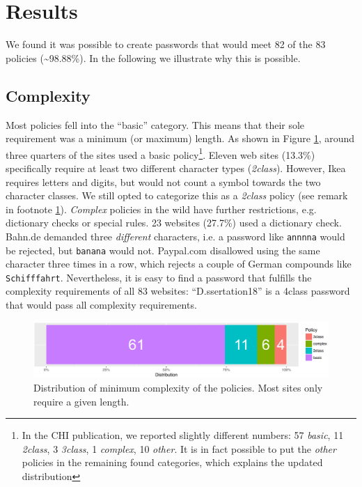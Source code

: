 
\section{Results}
We found it was possible to create passwords that would meet 82 of the 83 policies (\textasciitilde98.88\%). In the following we illustrate why this is possible. 

\subsection{Complexity}
Most policies fell into the ``basic'' category. This means that their sole requirement was a minimum (or maximum) length. As shown in Figure \ref{fig:policies_reuse:policies-distribution-edited}, around three quarters of the sites used a basic policy\footnote{\label{foot:policies_reuse:chi-publication-inconsistency}In the CHI publication, we reported slightly different numbers: 57 \textit{basic}, 11 \textit{2class}, 3 \textit{3class}, 1 \textit{complex}, 10 \textit{other}. It is in fact possible to put the \textit{other} policies in the remaining found categories, which explains the updated distribution}. 
Eleven web sites (13.3\%) specifically require at least two different character types (\textit{2class}). However, Ikea requires letters and digits, but would not count a symbol towards the two character classes. We still opted to categorize this as a \textit{2class} policy (see remark in footnote \ref{foot:policies_reuse:chi-publication-inconsistency}). \textit{Complex} policies in the wild have further restrictions, e.g. dictionary checks or special rules. 23 websites (27.7\%) used a dictionary check. Bahn.de demanded three \textit{different} characters, i.e. a password like \texttt{annnna} would be rejected, but \texttt{banana} would not. Paypal.com disallowed using the same character three times in a row, which rejects a couple of German compounds like \texttt{Schifffahrt}. Nevertheless, it is easy to find a password that fulfills the complexity requirements of all 83 websites: ``D.ssertation18'' is a 4class password that would pass all complexity requirements. 

\begin{figure}[tbph]
	\centering
	\includegraphics[width=\linewidth]{figures/policies/policies-distribution-edited-v2}
	\caption{\label{fig:policies_reuse:policies-distribution-edited}Distribution of minimum complexity of the policies. Most sites only require a given length.}
\end{figure}

